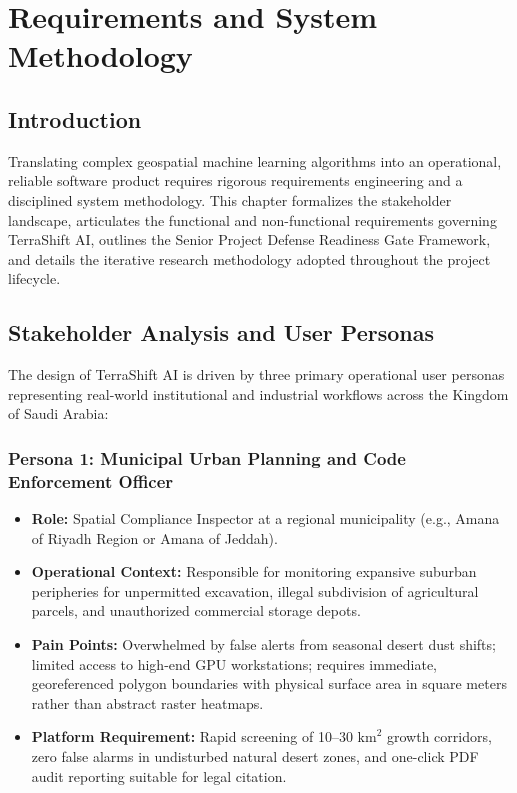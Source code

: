 \chapter{Requirements and System Methodology}
\label{ch:requirements}

\section{Introduction}
\label{sec:req_intro}
Translating complex geospatial machine learning algorithms into an operational, reliable software product requires rigorous requirements engineering and a disciplined system methodology. This chapter formalizes the stakeholder landscape, articulates the functional and non-functional requirements governing TerraShift AI, outlines the Senior Project Defense Readiness Gate Framework, and details the iterative research methodology adopted throughout the project lifecycle.

\section{Stakeholder Analysis and User Personas}
\label{sec:req_stakeholders}
The design of TerraShift AI is driven by three primary operational user personas representing real-world institutional and industrial workflows across the Kingdom of Saudi Arabia:

\subsection{Persona 1: Municipal Urban Planning and Code Enforcement Officer}
\begin{itemize}
    \item \textbf{Role:} Spatial Compliance Inspector at a regional municipality (e.g., Amana of Riyadh Region or Amana of Jeddah).
    \item \textbf{Operational Context:} Responsible for monitoring expansive suburban peripheries for unpermitted excavation, illegal subdivision of agricultural parcels, and unauthorized commercial storage depots.
    \item \textbf{Pain Points:} Overwhelmed by false alerts from seasonal desert dust shifts; limited access to high-end GPU workstations; requires immediate, georeferenced polygon boundaries with physical surface area in square meters rather than abstract raster heatmaps.
    \item \textbf{Platform Requirement:} Rapid screening of 10--30 $\text{km}^2$ growth corridors, zero false alarms in undisturbed natural desert zones, and one-click PDF audit reporting suitable for legal citation.
\end{itemize}

